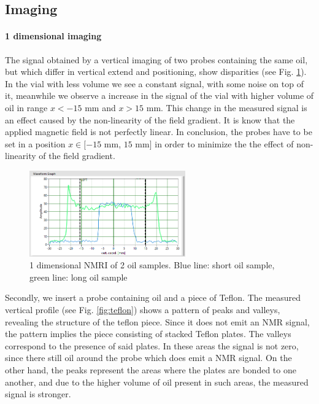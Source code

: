\subsection{Imaging}
\paragraph{1 dimensional imaging}
The signal obtained by a vertical imaging of two probes containing the same oil, but which differ in vertical extend and positioning, show disparities (see Fig. \ref{fig: long and short oil}). In the vial with less volume we see a constant signal, with some noise on top of it, meanwhile we observe a increase in the signal of the vial with higher volume of oil in range $x < -15$ mm and $x > 15$ mm. This change in the measured signal is an effect caused by the non-linearity of the field gradient. It is know that the applied magnetic field is not perfectly linear. In conclusion, the probes have to be set in a position $x \in [-15$ mm, $15$ mm$]$ in order to minimize the the effect of non-linearity of the field gradient. 
\begin{figure}[!htbp]
  \begin{center}
    \includegraphics[width= 0.6\textwidth]{./Protocol images/III/long&short_signal.png}
 \caption{1 dimensional NMRI of 2 oil samples. Blue line: short oil sample, green line: long oil sample}
    \label{fig: long and short oil}
   \end{center}
 \end{figure} 
 
Secondly, we insert a probe containing oil and a piece of Teflon. The measured vertical profile (see Fig. \ref{fig:teflon}) shows a pattern of peaks and valleys, revealing the structure of the teflon piece. Since it does not emit an NMR signal, the pattern implies the piece consisting of stacked Teflon plates. The valleys correspond to the presence of said plates. In these areas the signal is not zero, since there still oil around the probe which does emit a NMR signal. On the other hand, the peaks represent the areas where the plates are bonded to one another, and due to the higher volume of oil present in such areas, the measured signal is stronger.  

